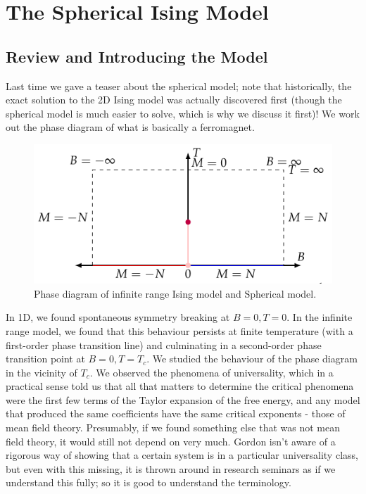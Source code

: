 \section{The Spherical Ising Model}

\subsection{Review and Introducing the Model}
Last time we gave a teaser about the spherical model; note that historically, the exact solution to the 2D Ising model was actually discovered first (though the spherical model is much easier to solve, which is why we discuss it first)! We work out the phase diagram of what is basically a ferromagnet.

\begin{figure}[htbp]
    \centering
    \includegraphics{Images/fig-IsingphasediagramB0.pdf}
    \caption{Phase diagram of infinite range Ising model and Spherical model.}
    \label{fig-sphericalmodelphasediagram}
\end{figure}

In 1D, we found spontaneous symmetry breaking at $B = 0, T = 0$. In the infinite range model, we found that this behaviour persists at finite temperature (with a first-order phase transition line) and culminating in a second-order phase transition point at $B = 0, T = T_c$. We studied the behaviour of the phase diagram in the vicinity of $T_c$. We observed the phenomena of universality, which in a practical sense told us that all that matters to determine the critical phenomena were the first few terms of the Taylor expansion of the free energy, and any model that produced the same coefficients have the same critical exponents - those of mean field theory. Presumably, if we found something else that was not mean field theory, it would still not depend on very much. Gordon isn't aware of a rigorous way of showing that a certain system is in a particular universality class, but even with this missing, it is thrown around in research seminars as if we understand this fully; so it is good to understand the terminology.

